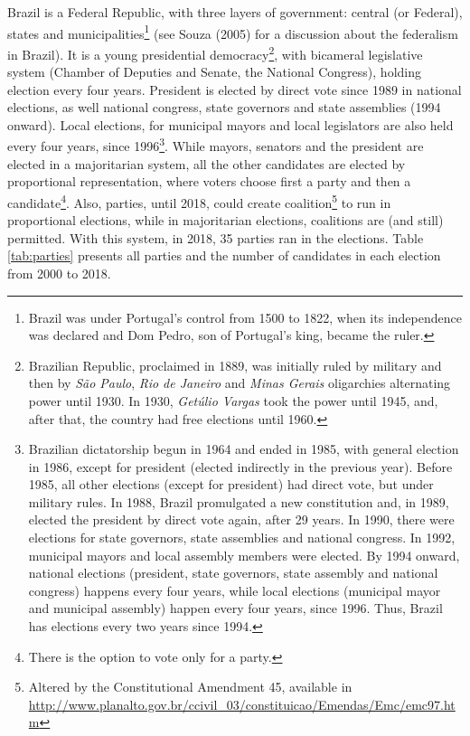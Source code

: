 \documentclass[
  12pt,
]{article}
\begin{document}
Brazil is a Federal Republic, with three layers of government: central
(or Federal), states and municipalities\footnote{Brazil was under
  Portugal's control from 1500 to 1822, when its independence was
  declared and Dom Pedro, son of Portugal's king, became the ruler.}
(see Souza (2005) for a discussion about the federalism in Brazil). It
is a young presidential democracy\footnote{Brazilian Republic,
  proclaimed in 1889, was initially ruled by military and then by
  \emph{São Paulo}, \emph{Rio de Janeiro} and \emph{Minas Gerais}
  oligarchies alternating power until 1930. In 1930, \emph{Getúlio
  Vargas} took the power until 1945, and, after that, the country had
  free elections until 1960.}, with bicameral legislative system
(Chamber of Deputies and Senate, the National Congress), holding
election every four years. President is elected by direct vote since
1989 in national elections, as well national congress, state governors
and state assemblies (1994 onward). Local elections, for municipal
mayors and local legislators are also held every four years, since
1996\footnote{Brazilian dictatorship begun in 1964 and ended in 1985,
  with general election in 1986, except for president (elected
  indirectly in the previous year). Before 1985, all other elections
  (except for president) had direct vote, but under military rules. In
  1988, Brazil promulgated a new constitution and, in 1989, elected the
  president by direct vote again, after 29 years. In 1990, there were
  elections for state governors, state assemblies and national congress.
  In 1992, municipal mayors and local assembly members were elected. By
  1994 onward, national elections (president, state governors, state
  assembly and national congress) happens every four years, while local
  elections (municipal mayor and municipal assembly) happen every four
  years, since 1996. Thus, Brazil has elections every two years since
  1994.}. While mayors, senators and the president are elected in a
majoritarian system, all the other candidates are elected by
proportional representation, where voters choose first a party and then
a candidate\footnote{There is the option to vote only for a party.}.
Also, parties, until 2018, could create coalition\footnote{Altered by
  the Constitutional Amendment 45, available in
  \url{http://www.planalto.gov.br/ccivil_03/constituicao/Emendas/Emc/emc97.htm}}
to run in proportional elections, while in majoritarian elections,
coalitions are (and still) permitted. With this system, in 2018, 35
parties ran in the elections. Table \ref{tab:parties} presents all
parties and the number of candidates in each election from 2000 to 2018.
\end{document}
